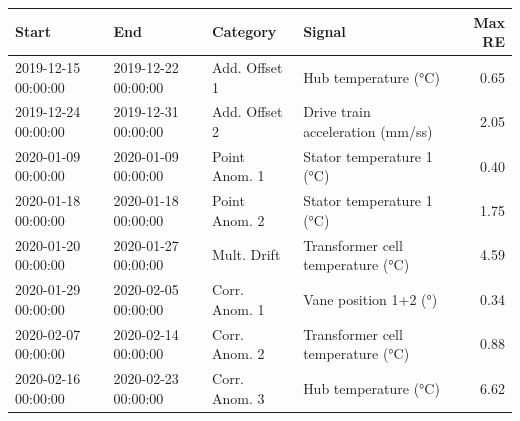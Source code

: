 \begin{tabular}{llllr}
\toprule
Start & End & Category & Signal & Max RE \\
\midrule
2019-12-15 00:00:00 & 2019-12-22 00:00:00 & Add. Offset 1 & Hub temperature (°C) & 0.65 \\
2019-12-24 00:00:00 & 2019-12-31 00:00:00 & Add. Offset 2 & Drive train acceleration (mm/ss) & 2.05 \\
2020-01-09 00:00:00 & 2020-01-09 00:00:00 & Point Anom. 1 & Stator temperature 1 (°C) & 0.40 \\
2020-01-18 00:00:00 & 2020-01-18 00:00:00 & Point Anom. 2 & Stator temperature 1 (°C) & 1.75 \\
2020-01-20 00:00:00 & 2020-01-27 00:00:00 & Mult. Drift & Transformer cell temperature (°C) & 4.59 \\
2020-01-29 00:00:00 & 2020-02-05 00:00:00 & Corr. Anom. 1 & Vane position 1+2 (°) & 0.34 \\
2020-02-07 00:00:00 & 2020-02-14 00:00:00 & Corr. Anom. 2 & Transformer cell temperature (°C) & 0.88 \\
2020-02-16 00:00:00 & 2020-02-23 00:00:00 & Corr. Anom. 3 & Hub temperature (°C) & 6.62 \\
\bottomrule
\end{tabular}
